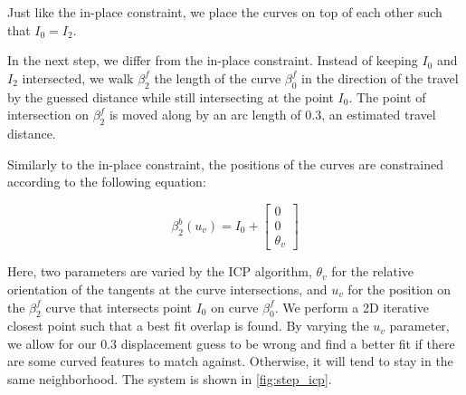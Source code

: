 Just like the in-place constraint, we place the curves on top of each other such that $I_0 = I_2$.

In the next step, we differ from the in-place constraint. Instead of keeping $I_0$ and $I_2$ intersected, we walk $\beta_2^f$ the length of the curve $\beta_0^f$ in the direction of the travel by the guessed distance while still intersecting at the point $I_0$. The point of intersection on $\beta_2^f$ is moved along by an arc length of $0.3$, an estimated travel distance.

Similarly to the in-place constraint, the positions of the curves are constrained according to the following equation:


\begin{equation}
\beta_2^b(u_v) = I_0 +
\begin{bmatrix}
0 \\
0 \\
\theta_v
\end{bmatrix}
\end{equation}


Here, two parameters are varied by the ICP algorithm, $\theta_v$ for the relative orientation of the tangents at the curve intersections, and $u_v$ for the position on the $\beta_2^f$ curve that intersects point $I_0$ on curve $\beta_0^f$. We perform a 2D iterative closest point such that a best fit overlap is found. By varying the $u_v$ parameter, we allow for our $0.3$ displacement guess to be wrong and find a better fit if there are some curved features to match against. Otherwise, it will tend to stay in the same neighborhood. The system is shown in \autoref{fig:step_icp}.

